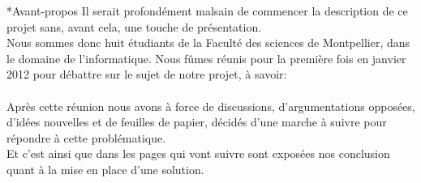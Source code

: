 \documentclass[a4paper, 12pt]{report}
\begin{document}
\begin{chapter}*{Avant-propos}
	Il serait profondément malsain de commencer la description de ce projet sans, avant cela, une touche de présentation.\\
	Nous sommes donc huit étudiants de la Faculté des sciences de Montpellier, dans le domaine de l'informatique.
	Nous fûmes réunis pour la première fois en janvier 2012 pour débattre sur le sujet de notre projet, à savoir:\\ 
	\\


    Après cette réunion nous avons à force de discussions, d'argumentations opposées, d'idées nouvelles et de feuilles de papier, décidés d'une 
    marche à suivre pour répondre à cette problématique.\\
    Et c'est ainsi que dans les pages qui vont suivre sont exposées nos conclusion quant à la mise en place d'une solution.	
\end{chapter}
\end{document}
